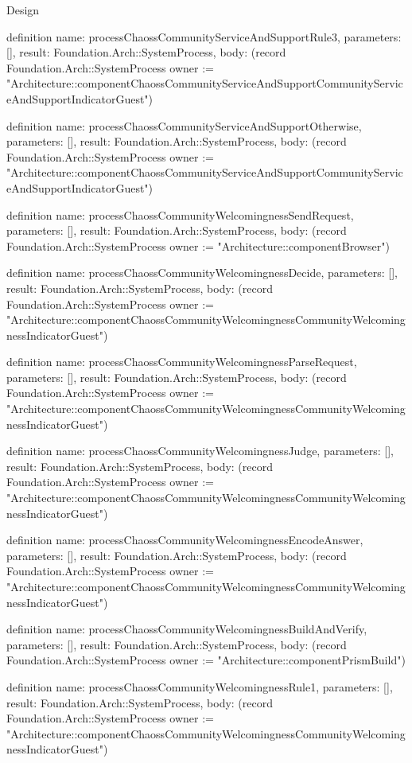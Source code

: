 \begin{lexlean}{Design}
\begin{semanticmodule}
definition{
  name: processChaossCommunityServiceAndSupportRule3,
  parameters: [],
  result: Foundation.Arch::SystemProcess,
  body: (record Foundation.Arch::SystemProcess {owner := "Architecture::componentChaossCommunityServiceAndSupportCommunityServiceAndSupportIndicatorGuest"})
}

definition{
  name: processChaossCommunityServiceAndSupportOtherwise,
  parameters: [],
  result: Foundation.Arch::SystemProcess,
  body: (record Foundation.Arch::SystemProcess {owner := "Architecture::componentChaossCommunityServiceAndSupportCommunityServiceAndSupportIndicatorGuest"})
}

definition{
  name: processChaossCommunityWelcomingnessSendRequest,
  parameters: [],
  result: Foundation.Arch::SystemProcess,
  body: (record Foundation.Arch::SystemProcess {owner := "Architecture::componentBrowser"})
}

definition{
  name: processChaossCommunityWelcomingnessDecide,
  parameters: [],
  result: Foundation.Arch::SystemProcess,
  body: (record Foundation.Arch::SystemProcess {owner := "Architecture::componentChaossCommunityWelcomingnessCommunityWelcomingnessIndicatorGuest"})
}

definition{
  name: processChaossCommunityWelcomingnessParseRequest,
  parameters: [],
  result: Foundation.Arch::SystemProcess,
  body: (record Foundation.Arch::SystemProcess {owner := "Architecture::componentChaossCommunityWelcomingnessCommunityWelcomingnessIndicatorGuest"})
}

definition{
  name: processChaossCommunityWelcomingnessJudge,
  parameters: [],
  result: Foundation.Arch::SystemProcess,
  body: (record Foundation.Arch::SystemProcess {owner := "Architecture::componentChaossCommunityWelcomingnessCommunityWelcomingnessIndicatorGuest"})
}

definition{
  name: processChaossCommunityWelcomingnessEncodeAnswer,
  parameters: [],
  result: Foundation.Arch::SystemProcess,
  body: (record Foundation.Arch::SystemProcess {owner := "Architecture::componentChaossCommunityWelcomingnessCommunityWelcomingnessIndicatorGuest"})
}

definition{
  name: processChaossCommunityWelcomingnessBuildAndVerify,
  parameters: [],
  result: Foundation.Arch::SystemProcess,
  body: (record Foundation.Arch::SystemProcess {owner := "Architecture::componentPrismBuild"})
}

definition{
  name: processChaossCommunityWelcomingnessRule1,
  parameters: [],
  result: Foundation.Arch::SystemProcess,
  body: (record Foundation.Arch::SystemProcess {owner := "Architecture::componentChaossCommunityWelcomingnessCommunityWelcomingnessIndicatorGuest"})
}


\end{semanticmodule}
\end{lexlean}
